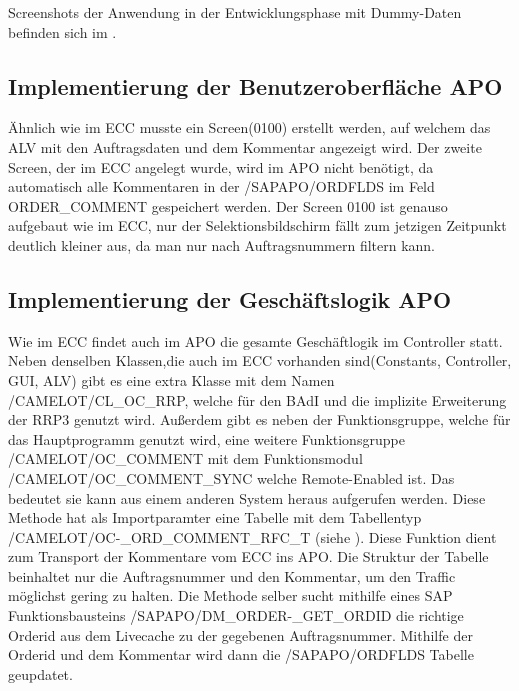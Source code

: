 Screenshots der Anwendung in der Entwicklungsphase mit Dummy-Daten befinden sich im .

\subsection{Implementierung der Benutzeroberfläche APO}
\label{sec:Implementierung der Benutzeroberfläche APO} 
Ähnlich wie im \ac{ECC} musste ein Screen(0100) erstellt werden, auf welchem das \ac{ALV} mit den Auftragsdaten und dem Kommentar angezeigt wird. Der zweite Screen, der im \ac{ECC} angelegt wurde, wird im \ac{APO} nicht benötigt, da automatisch alle Kommentaren in der /SAPAPO/ORDFLDS im Feld ORDER\_COMMENT gespeichert werden. Der Screen 0100 ist genauso aufgebaut wie im \ac{ECC}, nur der Selektionsbildschirm fällt zum jetzigen Zeitpunkt deutlich kleiner aus, da man nur nach Auftragsnummern filtern kann.  

\subsection{Implementierung der Geschäftslogik APO}
\label{sec:Implementierung der Geschäftslogik APO}  
Wie im \ac{ECC} findet auch im \ac{APO} die gesamte Geschäftlogik im Controller statt. Neben denselben Klassen,die auch im \ac{ECC} vorhanden sind(Constants, Controller, \ac{GUI}, \ac{ALV}) gibt es eine extra Klasse mit dem Namen /CAMELOT/CL\_OC\_RRP, welche für den \ac{BAdI} und die implizite Erweiterung der RRP3 genutzt wird. Außerdem gibt es neben der Funktionsgruppe, welche für das Hauptprogramm genutzt wird, eine weitere Funktionsgruppe /CAMELOT/OC\_COMMENT mit dem Funktionsmodul /CAMELOT/OC\_COMMENT\_SYNC welche Remote-Enabled ist. Das bedeutet sie kann aus einem anderen System heraus aufgerufen werden. Diese Methode hat als Importparamter eine Tabelle mit dem Tabellentyp /CAMELOT/OC-\_ORD\_COMMENT\_RFC\_T (siehe ). Diese Funktion dient zum Transport der Kommentare vom \ac{ECC} ins \ac{APO}. Die Struktur der Tabelle beinhaltet nur die Auftragsnummer und den Kommentar, um den Traffic möglichst gering zu halten. Die Methode selber sucht mithilfe eines SAP Funktionsbausteins /SAPAPO/DM\_ORDER-\_GET\_ORDID die richtige Orderid aus dem Livecache zu der gegebenen Auftragsnummer. Mithilfe der Orderid und dem Kommentar wird dann die /SAPAPO/ORDFLDS Tabelle geupdatet.  

